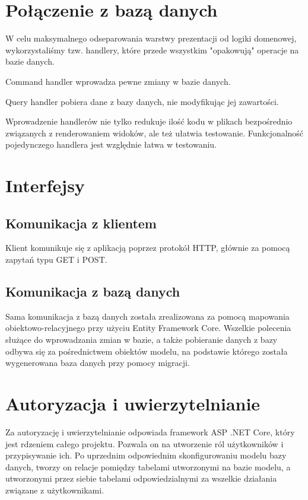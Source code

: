 \documentclass{article}
\begin{document}
\section{Połączenie z bazą danych}
W celu maksymalnego odseparowania warstwy prezentacji od logiki domenowej, wykorzystaliśmy tzw. handlery, które przede wszystkim "opakowują" operacje na bazie danych.

Command handler wprowadza pewne zmiany w bazie danych.

Query handler pobiera dane z bazy danych, nie modyfikując jej zawartości.

Wprowadzenie handlerów nie tylko redukuje ilość kodu w plikach bezpośrednio związanych z renderowaniem widoków, ale też ułatwia testowanie. Funkcjonalność pojedynczego handlera jest względnie łatwa w testowaniu.

\section{Interfejsy}
\subsection{Komunikacja z klientem}
Klient komunikuje się z aplikacją poprzez protokół HTTP, głównie za pomocą zapytań typu GET i POST. 

\subsection{Komunikacja z bazą danych}
Sama komunikacja z bazą danych została zrealizowana za pomocą mapowania obiektowo-relacyjnego przy użyciu Entity Framework Core. Wszelkie polecenia służące do wprowadzania zmian w bazie, a także pobieranie danych z bazy odbywa się za pośrednictwem obiektów modelu, na podstawie którego została wygenerowana baza danych przy pomocy migracji.

\section{Autoryzacja i uwierzytelnianie}
Za autoryzację i uwierzytelnianie odpowiada framework ASP .NET Core, który jest rdzeniem całego projektu. Pozwala on na utworzenie ról użytkowników i przypisywanie ich. Po uprzednim odpowiednim skonfigurowaniu modelu bazy danych, tworzy on relacje pomiędzy tabelami utworzonymi na bazie modelu, a utworzonymi przez siebie tabelami odpowiedzialnymi za wszelkie działania związane z użytkownikami.
\end{document}
